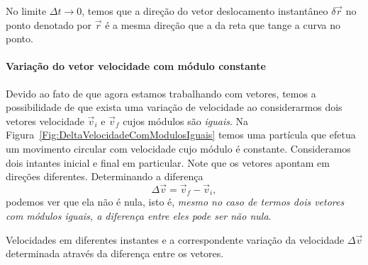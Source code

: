 \begin{marginfigure}[-1cm]
\caption{No limite $\Delta t \to 0$, temos que a direção do vetor deslocamento instantâneo $\delta\vec{r}$ no ponto denotado por $\vec{r}$ é a mesma direção que a da reta que tange a curva no ponto.\label{Fig:Dir_vel}}
\end{marginfigure}

\paragraph{Variação do vetor velocidade com módulo constante}

Devido ao fato de que agora estamos trabalhando com vetores, temos a possibilidade de que exista uma variação de velocidade ao considerarmos dois vetores velocidade $\vec{v}_i$ e $\vec{v}_f$ cujos módulos são \emph{iguais}. Na Figura~\ref{Fig:DeltaVelocidadeComModulosIguais} temos uma partícula que efetua um movimento circular com velocidade cujo módulo é constante. Consideramos dois intantes inicial e final em particular. Note que os vetores apontam em direções diferentes. Determinando a diferença
\begin{equation}
	\Delta \vec{v} = \vec{v}_f - \vec{v}_i,
\end{equation}
%
podemos ver que ela não é nula, isto é, \emph{mesmo no caso de termos dois vetores com módulos iguais, a diferença entre eles pode ser não nula}.

\begin{marginfigure}
   \caption{Velocidades em diferentes instantes e a correspondente variação da velocidade $\Delta\vec{v}$ determinada através da diferença entre os vetores. \label{Fig:DeltaVelocidadeComModulosIguais}}
\end{marginfigure}

